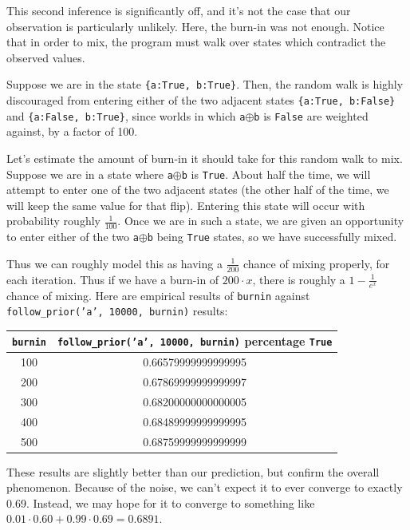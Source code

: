 \documentclass[11pt]{article}
\begin{document}
This second inference is significantly off, and it's not the case that our observation is particularly unlikely.  Here, the burn-in was not enough.  Notice that in order to mix, the program must walk over states which contradict the observed values.  

Suppose we are in the state {\tt \{a:True, b:True\}}.  Then, the random walk is highly discouraged from entering either of the two adjacent states {\tt \{a:True, b:False\}} and {\tt \{a:False, b:True\}}, since worlds in which {\tt a$\oplus$b} is {\tt False} are weighted against, by a factor of 100.  

Let's estimate the amount of burn-in it should take for this random walk to mix.  Suppose we are in a state where {\tt a$\oplus$b} is {\tt True}.  About half the time, we will attempt to enter one of the two adjacent states (the other half of the time, we will keep the same value for that flip).  Entering this state will occur with probability roughly $\frac{1}{100}$.  Once we are in such a state, we are given an opportunity to enter either of the two {\tt a$\oplus$b} being {\tt True} states, so we have successfully mixed.  

Thus we can roughly model this as having a $\frac{1}{200}$ chance of mixing properly, for each iteration.  Thus if we have a burn-in of $200 \cdot x$, there is roughly a $1 - \frac{1}{e^x}$ chance of mixing.  Here are empirical results of {\tt burnin} against {\tt follow\_prior('a', 10000, burnin)} results:

\begin{center}
\begin{tabular}{|c | c|} \hline
{\tt burnin} & {\tt follow\_prior('a', 10000, burnin)} percentage {\tt True}  \\ \hline
100 &  0.66579999999999995 \\ \hline
200 &  0.67869999999999997 \\ \hline
300 &  0.68200000000000005 \\ \hline
400 &  0.68489999999999995 \\ \hline
500 &  0.68759999999999999 \\ \hline
\end{tabular}
\end{center}

These results are slightly better than our prediction, but confirm the overall phenomenon.  Because of the noise, we can't expect it to ever converge to exactly 0.69.  Instead, we may hope for it to converge to something like $0.01 \cdot 0.60 + 0.99 \cdot 0.69 = 0.6891$.  
\end{document}
